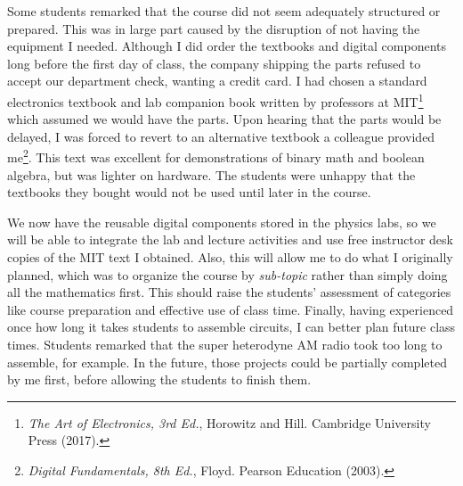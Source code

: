 \documentclass[../../main.tex]{subfiles}
\begin{document}
Some students remarked that the course did not seem adequately structured or prepared.  This was in large part caused by the disruption of not having the equipment I needed.  Although I did order the textbooks and digital components long before the first day of class, the company shipping the parts refused to accept our department check, wanting a credit card.  I had chosen a standard electronics textbook and lab companion book written by professors at MIT\footnote{\textit{The Art of Electronics, 3rd Ed.}, Horowitz and Hill. Cambridge University Press (2017).} which assumed we would have the parts. Upon hearing that the parts would be delayed, I was forced to revert to an alternative textbook a colleague provided me\footnote{\textit{Digital Fundamentals, 8th Ed.}, Floyd.  Pearson Education (2003).}. This text was excellent for demonstrations of binary math and boolean algebra, but was lighter on hardware. The students were unhappy that the textbooks they bought would not be used until later in the course. \\ \hspace{0.1cm}

We now have the reusable digital components stored in the physics labs, so we will be able to integrate the lab and lecture activities and use free instructor desk copies of the MIT text I obtained.  Also, this will allow me to do what I originally planned, which was to organize the course by \textit{sub-topic} rather than simply doing all the mathematics first.  This should raise the students' assessment of categories like course preparation and effective use of class time.  Finally, having experienced once how long it takes students to assemble circuits, I can better plan future class times.  Students remarked that the super heterodyne AM radio took too long to assemble, for example.  In the future, those projects could be partially completed by me first, before allowing the students to finish them. \\ \hspace{0.1cm}
\end{document}
